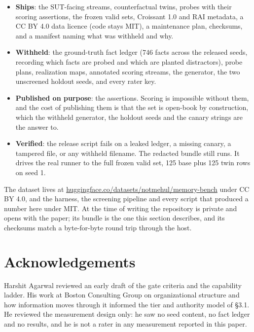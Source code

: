 \documentclass[11pt]{article}
\begin{document}
\begin{itemize}[leftmargin=*, itemsep=.3em]
\item \textbf{Ships}: the SUT-facing streams, counterfactual twins, probes with
their scoring assertions, the frozen valid sets, Croissant 1.0 and RAI metadata,
a CC BY 4.0 data licence (code stays MIT), a maintenance plan, checksums, and a
manifest naming what was withheld and why.

\item \textbf{Withheld}: the ground-truth fact ledger (746 facts across the
released seeds, recording which facts are probed and which are planted
distractors), probe plans, realization maps, annotated scoring streams, the
generator, the two unscreened holdout seeds, and every rater key.

\item \textbf{Published on purpose}: the assertions. Scoring is impossible
without them, and the cost of publishing them is that the set is open-book by
construction, which the withheld generator, the holdout seeds and the canary
strings are the answer to.

\item \textbf{Verified}: the release script fails on a leaked ledger, a missing
canary, a tampered file, or any withheld filename. The redacted bundle still runs. It drives the real runner to the full frozen
valid set, 125 base plus 125 twin rows on seed 1.
\end{itemize}

The dataset lives at
\href{https://huggingface.co/datasets/notmehul/memory-bench}{huggingface.co/datasets/notmehul/memory-bench}
under CC BY 4.0, and the harness, the screening pipeline and every script that
produced a number here under MIT. At the time of writing the repository is
private and opens with the paper; its bundle is the one this section describes,
and its checksums match a byte-for-byte round trip through the host.

\section*{Acknowledgements}

Harshit Agarwal reviewed an early draft of the gate criteria and the capability
ladder. His work at Boston Consulting Group on organizational structure and how
information moves through it informed the tier and authority model of \S3.1. He
reviewed the measurement design only: he saw no seed content, no fact ledger and
no results, and he is not a rater in any measurement reported in this paper.
\end{document}
